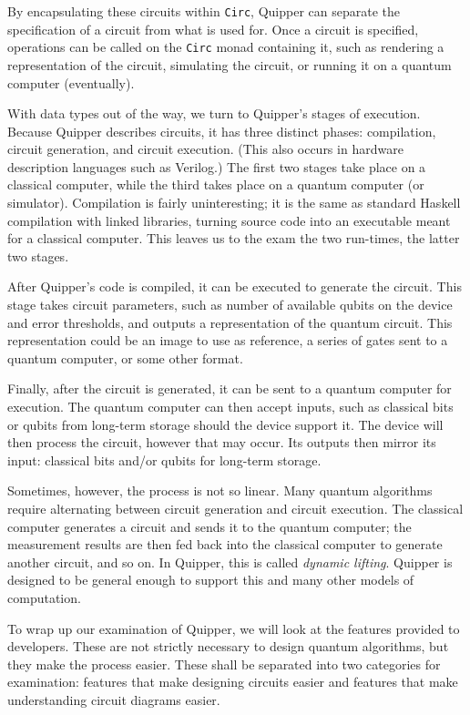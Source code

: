 \documentclass[]{article}
\begin{document}
By encapsulating these circuits within \texttt{Circ}, Quipper can separate the specification of a circuit from what is used for. Once a circuit is specified, operations can be called on the \texttt{Circ} monad containing it, such as rendering a representation of the circuit, simulating the circuit, or running it on a quantum computer (eventually).

With data types out of the way, we turn to Quipper's stages of execution. Because Quipper describes circuits, it has three distinct phases: compilation, circuit generation, and circuit execution. (This also occurs in hardware description languages such as Verilog.) The first two stages take place on a classical computer, while the third takes place on a quantum computer (or simulator). Compilation is fairly uninteresting; it is the same as standard Haskell compilation with linked libraries, turning source code into an executable meant for a classical computer. This leaves us to the exam the two run-times, the latter two stages.

After Quipper's code is compiled, it can be executed to generate the circuit. This stage takes circuit parameters, such as number of available qubits on the device and error thresholds, and outputs a representation of the quantum circuit. This representation could be an image to use as reference, a series of gates sent to a quantum computer, or some other format.

Finally, after the circuit is generated, it can be sent to a quantum computer for execution. The quantum computer can then accept inputs, such as classical bits or qubits from long-term storage should the device support it. The device will then process the circuit, however that may occur. Its outputs then mirror its input: classical bits and/or qubits for long-term storage.

Sometimes, however, the process is not so linear. Many quantum algorithms require alternating between circuit generation and circuit execution. The classical computer generates a circuit and sends it to the quantum computer; the measurement results are then fed back into the classical computer to generate another circuit, and so on. In Quipper, this is called \textit{dynamic lifting}. Quipper is designed to be general enough to support this and many other models of computation.

To wrap up our examination of Quipper, we will look at the features provided to developers. These are not strictly necessary to design quantum algorithms, but they make the process easier. These shall be separated into two categories for examination: features that make designing circuits easier and features that make understanding circuit diagrams easier.
\end{document}
